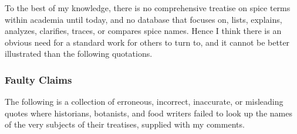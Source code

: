 To the best of my knowledge, there is no comprehensive treatise on spice terms within academia until today, and no database that focuses on, lists, explains, analyzes, clarifies, traces, or compares spice names. Hence I think there is an obvious need for a standard work for others to turn to, and it cannot be better illustrated than the following quotations.

\subsubsection{Faulty Claims}

The following is a collection of erroneous, incorrect, inaccurate, or misleading quotes where historians, botanists, and food writers failed to look up the names of the very subjects of their treatises, supplied with my comments.

